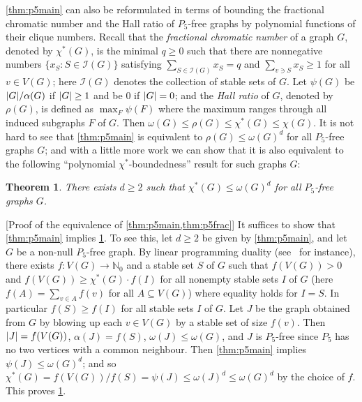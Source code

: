 \documentclass[11pt,reqno]{amsart}
\newtheorem{theorem}{Theorem}[section]
\let\oldendproof\endproof
\renewenvironment{proof}[1][\proofname]{%
	\oldproof[\normalfont\bfseries #1]%
}{\oldendproof}
\newcommand{\dd}{\textquotedblleft}
\newcommand{\ee}{\textquotedblright}
\newcommand{\mac}{\mathcal}
\newcommand{\mab}{\mathbb}
\renewcommand{\subset}{\subseteq}
\newcommand{\chis}{\chi^*}
\DeclarePairedDelimiter\abs{\lvert}{\rvert}%
\begin{document}
	\cref{thm:p5main} can also be reformulated in terms of bounding the fractional chromatic number and the Hall ratio of $P_5$-free graphs by polynomial functions of their clique numbers.
	Recall that the {\em fractional chromatic number} of a graph $G$, denoted by $\chis(G)$, is the minimal $q\ge0$ such that there are nonnegative numbers $\{x_S:S\in\mac I(G)\}$ satisfying $\sum_{S\in \mac I(G)}x_S=q$ and $\sum_{v\ni S}x_S\ge1$ for all $v\in V(G)$; here $\mac I(G)$ denotes the collection of stable sets of $G$.
	Let $\psi(G)$ be $\abs G/\alpha(G)$ if $\abs G\ge1$ and be $0$ if $\abs G=0$;
	and the {\em Hall ratio} of $G$, denoted by $\rho(G)$, is defined as $\max_F\psi(F)$ where the maximum ranges through all induced subgraphs $F$ of $G$.
	Then $\omega(G)\le\rho(G)\le\chis(G)\le\chi(G)$.
	It is not hard to see that \cref{thm:p5main} is equivalent to $\rho(G)\le\omega(G)^d$ for all $P_5$-free graphs $G$;
	and with a little more work we can show that it is also equivalent to the following \dd polynomial $\chis$-boundedness\ee{} result for such graphs $G$:
	\begin{theorem}
		\label{thm:p5frac}
		There exists $d\ge2$ such that $\chis(G)\le \omega(G)^d$ for all $P_5$-free graphs $G$.
	\end{theorem}
	\begin{proof}
		[Proof of the equivalence of \cref{thm:p5main,thm:p5frac}]
		It suffices to show that \cref{thm:p5main} implies \cref{thm:p5frac}.
		To see this, let $d\ge2$ be given by \cref{thm:p5main}, and let $G$ be a non-null $P_5$-free graph.
		By linear programming duality (see~\cite[Theorem 7.3.2]{MR1829620} for instance), there exists $f\colon V(G)\to\mab N_0$ and a stable set $S$ of $G$ such that $f(V(G))>0$ and $f(V(G))\ge\chis(G)\cdot f(I)$ for all nonempty stable sets $I$ of $G$ (here $f(A)=\sum_{v\in A}f(v)$ for all $A\subset V(G)$) where equality holds for $I=S$.
		In particular $f(S)\ge f(I)$ for all stable sets $I$ of $G$.
		Let $J$ be the graph obtained from $G$ by blowing up each $v\in V(G)$ by a stable set of size $f(v)$.
		Then $\abs J=f(V(G))$, $\alpha(J)=f(S)$, $\omega(J)\le\omega(G)$, and $J$ is $P_5$-free since $P_5$ has no two vertices with a common neighbour.
		Then \cref{thm:p5main} implies $\psi(J)\le\omega(G)^d$;
		and so $\chis(G)=f(V(G))/f(S)=\psi(J)\le\omega(J)^d\le\omega(G)^d$ by the choice of $f$.
		This proves \cref{thm:p5frac}.
	\end{proof}
	
\end{document}

